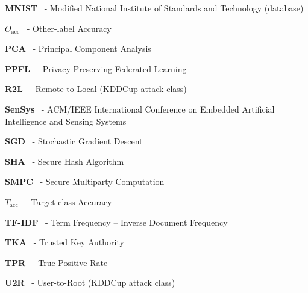 \documentclass{iitthesis}
\makeatletter
\renewcommand{\headrulewidth}{0.4pt}%
\renewcommand{\footrulewidth}{0pt}%
\renewcommand{\cleardoublepage}{%
	\clearpage
	\if@twoside
		\ifodd\c@page
		\else
			\hbox{}\thispagestyle{empty}\newpage
			\if@twocolumn\hbox{}\newpage\fi
		\fi
	\fi
}
\makeatother
\begin{document}
\begin{description}
		\item \textbf{MNIST} \, - Modified National Institute of Standards and Technology (database)
		\item \textbf{$O_{\text{acc}}$} \, - Other-label Accuracy
		\item \textbf{PCA} \, - Principal Component Analysis
		\item \textbf{PPFL} \, - Privacy-Preserving Federated Learning
		\item \textbf{R2L} \, - Remote-to-Local (KDDCup attack class)
		\item \textbf{SenSys} \, - ACM/IEEE International Conference on Embedded Artificial Intelligence and Sensing Systems
		\item \textbf{SGD} \, - Stochastic Gradient Descent
		\item \textbf{SHA} \, - Secure Hash Algorithm
		\item \textbf{SMPC} \, - Secure Multiparty Computation
		\item \textbf{$T_{\text{acc}}$} \, - Target-class Accuracy
		\item \textbf{TF-IDF} \, - Term Frequency -- Inverse Document Frequency
		\item \textbf{TKA} \, - Trusted Key Authority
		\item \textbf{TPR} \, - True Positive Rate
		\item \textbf{U2R} \, - User-to-Root (KDDCup attack class)
	\end{description}
	\endgroup

	\newpage
	\thispagestyle{empty}
	\cleardoublepage


	\fancypagestyle{plain}{%
		\fancyhf{}%
		\fancyfoot[C]{\small\thepage}%
		\renewcommand{\headrulewidth}{0pt}%
		\renewcommand{\footrulewidth}{0pt}%
	}
	\pagestyle{thesismain}
	
	
	
	
	\begingroup
	\let\cleardoublepage\clearpage
	
	
	
	
	
	\endgroup
	
	\singlespacing
	
	

	
	
\end{document}
